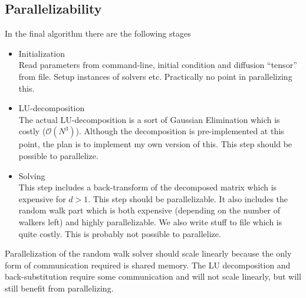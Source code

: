 \subsection{Parallelizability}
In the final algorithm there are the following stages
\begin{itemize}
 \item Initialization\\
 Read parameters from command-line, initial condition and diffusion ``tensor'' from file. Setup instances of solvers etc. Practically no point in parallelizing this.
 \item LU-decomposition\\
 The actual LU-decomposition is a sort of Gaussian Elimination which is costly ($\mathcal{O}(N^3)$). Although the decomposition is pre-implemented at this point, the plan is to implement my own version of this. This step should be possible to parallelize.
 \item Solving\\
 This step includes a back-transform of the decomposed matrix which is expensive for $d>1$. This step should be parallelizable. It also includes the random walk part which is both expensive (depending on the number of walkers left) and highly parallelizable. We also write stuff to file which is quite costly. This is probably not possible to parallelize.
\end{itemize}

Parallelization of the random walk solver should scale linearly because the only form of communication required is shared memory. 
The LU decomposition and back-substitution require some communication and will not scale linearly, but will still benefit from parallelizing. 
